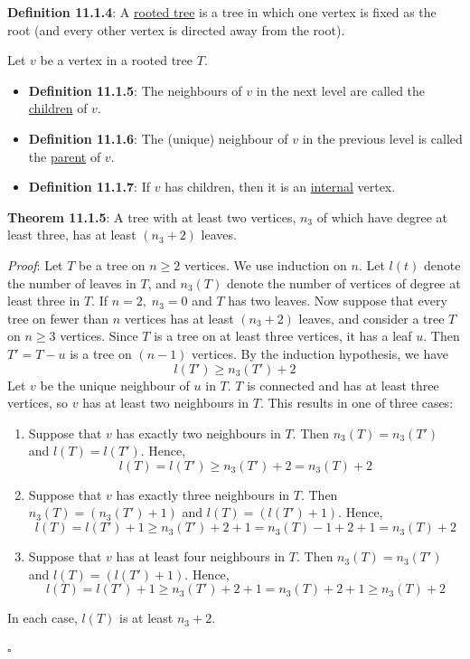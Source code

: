 \documentclass{article}
\newcommand{\separate}[1] {\vspace{#1 pt}\noindent}
\newcommand{\definition}[2]{\textbf{Definition #1}: #2\label{def:#1}}
\newcommand{\proof}[2]{\textit{Proof}: #2 \begin{flushright}\(\square\)\end{flushright}\label{prf:#1}}
\newcommand{\theorem}[3]{\textbf{Theorem #1}: #2 \par\separate{3}\proof{thm:#1}{#3}\label{thm:#1}}
\begin{document}
\separate{7}\definition{11.1.4}{A \underline{rooted tree} is a tree in which one vertex is fixed as the root (and every other vertex is directed away from the root).}

\separate{7}Let \(v\) be a vertex in a rooted tree \(T\).
\begin{itemize}
    \item \definition{11.1.5}{The neighbours of \(v\) in the next level are called the \underline{children} of \(v\).}
    \item \definition{11.1.6}{The (unique) neighbour of \(v\) in the previous level is called the \underline{parent} of \(v\).}
    \item \definition{11.1.7}{If \(v\) has children, then it is an \underline{internal} vertex.}
\end{itemize} 

\separate{7}\theorem{11.1.5}{A tree with at least two vertices, \(n_3\) of which have degree at least three, has at least \((n_3+2)\) leaves.}
{Let \(T\) be a tree on \(n \geq 2\) vertices. We use induction on \(n\). Let \(l(t)\) denote the number of leaves in \(T\), and \(n_3(T)\) denote the number of vertices of degree at least three in \(T\). If \(n=2, \; n_3=0\) and \(T\) has two leaves.
Now suppose that every tree on fewer than \(n\) vertices has at least \((n_3+2)\) leaves, and consider a tree \(T\) on \(n \geq 3\) vertices. Since \(T\) is a tree on at least three vertices, it has a leaf \(u\). Then \(T'=T-u\) is a tree on \((n-1)\) vertices. By the induction hypothesis, we have 
\begin{equation}l(T') \geq n_3(T') + 2\end{equation}
\newpage\noindent Let \(v\) be the unique neighbour of \(u\) in \(T\). \(T\) is connected and has at least three vertices, so \(v\) has at least two neighbours in \(T\). This results in one of three cases:
\begin{enumerate}
    \item Suppose that \(v\) has exactly two neighbours in \(T\). Then \(n_3(T)=n_3(T')\) and \(l(T)=l(T')\). Hence,
    \begin{equation}
        l(T) = l(T') \geq n_3(T') + 2 = n_3(T) + 2
    \end{equation}
    \item Suppose that \(v\) has exactly three neighbours in \(T\). Then \(n_3(T) = (n_3(T') + 1)\) and \(l(T) = (l(T') + 1)\). Hence,
    \begin{equation}
        l(T) = l(T') + 1 \geq n_3(T') + 2 + 1 = n_3(T) - 1 + 2 + 1 = n_3(T) + 2
    \end{equation}
    \item Suppose that \(v\) has at least four neighbours in \(T\). Then \(n_3(T) = n_3(T')\) and \(l(T) = (l(T') + 1)\). Hence,
    \begin{equation}
        l(T) = l(T') + 1 \geq n_3(T') + 2 + 1 = n_3(T) + 2 + 1 \geq n_3(T) + 2
    \end{equation}
\end{enumerate}
In each case, \(l(T)\) is at least \(n_3+2\).}
\end{document}

